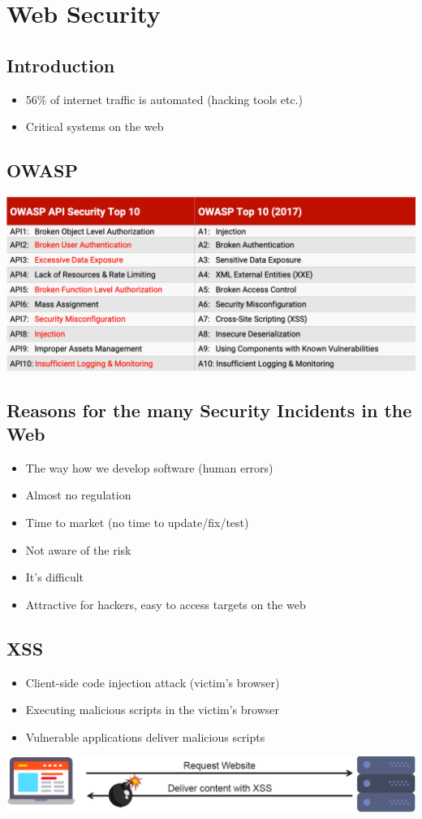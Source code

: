 
\section{Web Security}
\subsection{Introduction}
\begin{itemize}
    \item 56\% of internet traffic is automated (hacking tools etc.)
    \item Critical systems on the web
\end{itemize}
\subsection{OWASP}
\includegraphics[width=\linewidth]{../img/owasp.png}

\subsection{Reasons for the many Security Incidents in the Web}
\begin{itemize}
    \item The way how we develop software (human errors)
    \item Almost no regulation
    \item Time to market (no time to update/fix/test)
    \item Not aware of the risk
    \item It's difficult
    \item Attractive for hackers, easy to access targets on the web
\end{itemize}

\subsection{XSS}
\begin{itemize}
    \item Client-side code injection attack (victim's browser)
    \item Executing malicious scripts in the victim's browser
    \item Vulnerable applications deliver malicious scripts
\end{itemize}
\includegraphics[width=0.7\linewidth]{../img/xss.pn.png}\\

